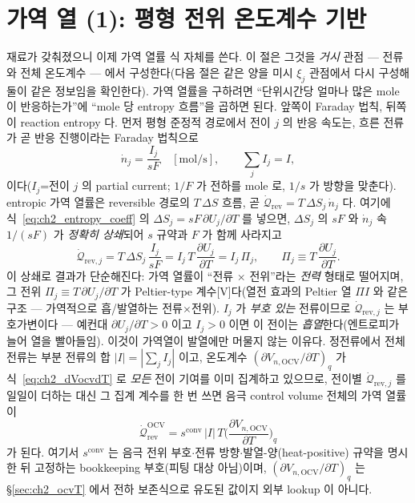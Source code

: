 \documentclass[11pt,a4paper]{article}
\newcommand{\OCV}{\mathrm{OCV}}
\newcommand{\rev}{\mathrm{rev}}
\newcommand{\conv}{\mathrm{conv}}
\begin{document}
\section{가역 열 (1): 평형 전위 온도계수 기반}\label{sec:ch2_revOCV}
재료가 갖춰졌으니 이제 가역 열률 식 자체를 쓴다. 이 절은 그것을 \emph{거시} 관점 — 전류와 전체 온도계수 — 에서
구성한다(다음 절은 같은 양을 미시 $\xi_j$ 관점에서 다시 구성해 둘이 같은 정보임을 확인한다). 가역 열률을 구하려면
``단위시간당 얼마나 많은 mole 이 반응하는가''에 ``mole 당 entropy 흐름''을 곱하면 된다. 앞쪽이 Faraday 법칙,
뒤쪽이 reaction entropy 다. 먼저 평형 준정적 경로에서 전이 $j$ 의 반응 속도는, 흐른 전류가 곧 반응 진행이라는
Faraday 법칙으로
\begin{equation}
\dot n_j=\frac{I_j}{sF}\quad[\mathrm{mol/s}],\qquad \sum_j I_j=I,
\label{eq:ch2_faraday}
\end{equation}
이다($I_j$=전이 $j$ 의 partial current; $1/F$ 가 전하를 mole 로, $1/s$ 가 방향을 맞춘다). entropic 가역 열률은
reversible 경로의 $T\,\Delta S$ 흐름, 곧 $\dot{\mathcal Q}_\rev=T\,\Delta S_j\,\dot n_j$ 다. 여기에
식~\eqref{eq:ch2_entropy_coeff} 의 $\Delta S_j=sF\,\partial U_j/\partial T$ 를 넣으면, $\Delta S_j$ 의 $sF$ 와
$\dot n_j$ 속 $1/(sF)$ 가 \emph{정확히 상쇄}되어 $s$ 규약과 $F$ 가 함께 사라지고
\begin{equation}
\boxed{\;\dot{\mathcal Q}_{\rev,j}=T\,\Delta S_j\,\frac{I_j}{sF}=I_j\,T\,\frac{\partial U_j}{\partial T}=I_j\,\Pi_j,\qquad
\Pi_j\equiv T\,\frac{\partial U_j}{\partial T}.\;}
\label{eq:ch2_qrev}
\end{equation}
이 상쇄로 결과가 단순해진다: 가역 열률이 ``전류 $\times$ 전위''라는 \emph{전력} 형태로 떨어지며, 그 전위
$\Pi_j\equiv T\,\partial U_j/\partial T$ 가 Peltier-type 계수[V]다(열전 효과의 Peltier 열 $\Pi I$ 와 같은 구조 —
가역적으로 흡/발열하는 전류$\times$전위). $I_j$ 가 \emph{부호 있는} 전류이므로 $\dot{\mathcal Q}_{\rev,j}$ 는
부호가변이다 — 예컨대 $\partial U_j/\partial T>0$ 이고 $I_j>0$ 이면 이 전이는 \emph{흡열}한다(엔트로피가 늘어 열을
빨아들임). 이것이 가역열이 발열에만 머물지 않는 이유다. 정전류에서 전체 전류는 부분 전류의 합 $|I|=|\sum_j I_j|$
이고, 온도계수 $(\partial V_{n,\OCV}/\partial T)_q$ 가 식~\eqref{eq:ch2_dVocvdT} 로 \emph{모든} 전이 기여를 이미
집계하고 있으므로, 전이별 $\dot{\mathcal Q}_{\rev,j}$ 를 일일이 더하는 대신 그 집계 계수를 한 번 쓰면 음극 control
volume 전체의 가역 열률이
\begin{equation}
\dot{\mathcal Q}_{\rev}^{\OCV}=s^{\conv}\,|I|\,T\Big(\frac{\partial V_{n,\OCV}}{\partial T}\Big)_q
\label{eq:ch2_revOCV}
\end{equation}
가 된다. 여기서 $s^{\conv}$ 는 음극 전위 부호$\cdot$전류 방향$\cdot$발열-양(heat-positive) 규약을 명시한 뒤
고정하는 bookkeeping 부호(피팅 대상 아님)이며, $(\partial V_{n,\OCV}/\partial T)_q$ 는 \S\ref{sec:ch2_ocvT} 에서
전하 보존식으로 유도된 값이지 외부 lookup 이 아니다.
\end{document}
